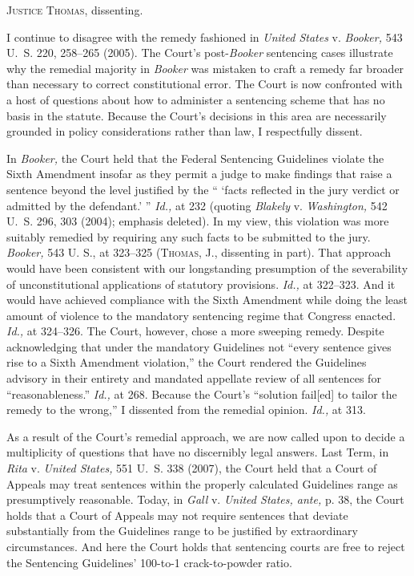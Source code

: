 
\setcounter{page}{114}

  \textsc{Justice Thomas,} dissenting.

  I continue to disagree with the remedy fashioned in \emph{United
States} v. \emph{Booker,} 543 U.~S. 220, 258--265 (2005). The
Court's post-\emph{Booker} sentencing cases illustrate why the remedial
majority in \emph{Booker} was mistaken to craft a remedy far broader than
necessary to correct constitutional error. The Court is now confronted
with a host of questions about how to administer a sentencing scheme
that has no basis in the statute. Because the Court's decisions in
this area are necessarily grounded in policy considerations rather than
law, I respectfully dissent.

  In \emph{Booker,} the Court held that the Federal Sentencing Guidelines
violate the Sixth Amendment insofar as they permit a judge to make
findings that raise a sentence beyond the level justified by the ``
‘facts reflected in the jury verdict or admitted by the defendant.'
'' \emph{Id.,} at 232 (quoting \emph{Blakely} v. \emph{Washington,} 542 U.~S.
296, 303 (2004); emphasis deleted). In my view, this violation was
more suitably remedied by requiring any such facts to be submitted
to the jury. \emph{Booker,} 543 U. S., at 323--325 (\textsc{Thomas,} J.,
dissenting in part). That approach would have been consistent with
our longstanding presumption of the severability of unconstitutional
applications of statutory provisions. \emph{Id.,} at 322--323. And
it would have achieved compliance with the Sixth Amendment while
doing the least amount of violence to the mandatory sentencing regime
that Congress enacted. \emph{Id.,} at 324--326. The Court, however,
chose a more sweeping remedy. Despite acknowledging that under the
mandatory Guidelines not ``every sentence gives rise to a Sixth
Amendment violation,'' the Court rendered the Guidelines advisory
in their entirety and mandated appellate review of all sentences for
``reasonableness.'' \emph{Id.,} at 268. Because the Court's
``solu\newpage tion fail[ed] to tailor the remedy to the wrong,'' I
dissented from the remedial opinion. \emph{Id.,} at 313.

  As a result of the Court's remedial approach, we are now called upon
to decide a multiplicity of questions that have no discernibly legal
answers. Last Term, in \emph{Rita} v. \emph{United States,} 551 U.~S. 338
(2007), the Court held that a Court of Appeals may treat sentences
within the properly calculated Guidelines range as presumptively
reasonable. Today, in \emph{Gall} v. \emph{United States, ante,} p. 38,
the Court holds that a Court of Appeals may not require sentences that
deviate substantially from the Guidelines range to be justified by
extraordinary circumstances. And here the Court holds that sentencing
courts are free to reject the Sentencing Guidelines' 100-to-1
crack-to-powder ratio.

